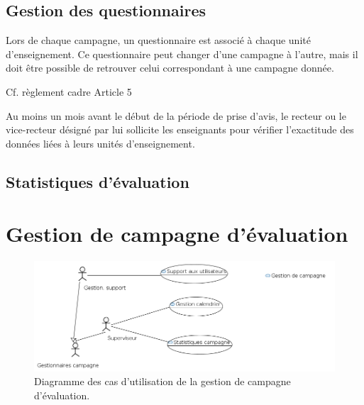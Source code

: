 \documentclass[a4paper,11pt]{report}
\begin{document}
\subsection{Gestion des questionnaires}\label{sec:constituer-quest}
Lors de chaque campagne, un questionnaire est associé à chaque unité d'enseignement.
Ce questionnaire peut changer d'une campagne à l'autre, mais il doit être possible de retrouver celui correspondant à une campagne donnée.

Cf. règlement cadre Article 5

Au moins un mois avant le début de la période de prise d'avis, le recteur ou le vice-recteur désigné par lui sollicite les enseignants pour vérifier l'exactitude des données liées à leurs unités d'enseignement.






\subsection{Statistiques d'évaluation}


















\newpage
\section{Gestion de campagne d'évaluation}

\begin{figure}[ht]
\includegraphics[width=\linewidth]{workspace/evalens-usecases/gestion_campagne.png}
\caption{Diagramme des cas d'utilisation de la gestion de campagne d'évaluation.}
\label{fig:usecase-campagne}
\end{figure}
\end{document}
